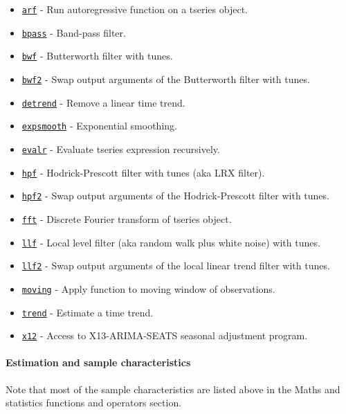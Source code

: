 \begin{itemize}
\itemsep1pt\parskip0pt
\item
  \href{tseries/arf}{\texttt{arf}} - Run autoregressive function on a
  tseries object.
\item
  \href{tseries/bpass}{\texttt{bpass}} - Band-pass filter.
\item
  \href{tseries/bwf}{\texttt{bwf}} - Butterworth filter with tunes.
\item
  \href{tseries/bwf2}{\texttt{bwf2}} - Swap output arguments of the
  Butterworth filter with tunes.
\item
  \href{tseries/detrend}{\texttt{detrend}} - Remove a linear time trend.
\item
  \href{tseries/expsmooth}{\texttt{expsmooth}} - Exponential smoothing.
\item
  \href{utils/evalr}{\texttt{evalr}} - Evaluate tseries expression
  recursively.
\item
  \href{tseries/hpf}{\texttt{hpf}} - Hodrick-Prescott filter with tunes
  (aka LRX filter).
\item
  \href{tseries/hpf2}{\texttt{hpf2}} - Swap output arguments of the
  Hodrick-Prescott filter with tunes.
\item
  \href{tseries/fft}{\texttt{fft}} - Discrete Fourier transform of
  tseries object.
\item
  \href{tseries/llf}{\texttt{llf}} - Local level filter (aka random walk
  plus white noise) with tunes.
\item
  \href{tseries/llf2}{\texttt{llf2}} - Swap output arguments of the
  local linear trend filter with tunes.
\item
  \href{tseries/moving}{\texttt{moving}} - Apply function to moving
  window of observations.
\item
  \href{tseries/trend}{\texttt{trend}} - Estimate a time trend.
\item
  \href{tseries/x12}{\texttt{x12}} - Access to X13-ARIMA-SEATS seasonal
  adjustment program.
\end{itemize}

\paragraph{Estimation and sample
characteristics}\label{estimation-and-sample-characteristics}

Note that most of the sample characteristics are listed above in the
Maths and statistics functions and operators section.

